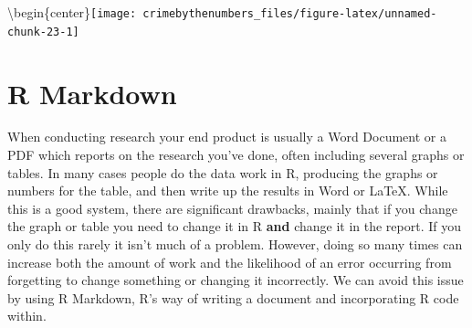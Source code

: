\documentclass[
  12pt,
]{book}
\newenvironment{Shaded}{\begin{snugshade}}{\end{snugshade}}
\newcommand{\DataTypeTok}[1]{\textcolor[rgb]{0.27,0.27,0.27}{#1}}
\newcommand{\DecValTok}[1]{\textcolor[rgb]{0.06,0.06,0.06}{#1}}
\newcommand{\KeywordTok}[1]{\textcolor[rgb]{0.27,0.27,0.27}{\textbf{#1}}}
\newcommand{\NormalTok}[1]{#1}
\newcommand{\OperatorTok}[1]{\textcolor[rgb]{0.43,0.43,0.43}{\textbf{#1}}}
\newcommand{\StringTok}[1]{\textcolor[rgb]{0.5,0.5,0.5}{#1}}
\begin{document}
\begin{Shaded}
\end{Shaded}

\textbackslash begin\{center\}\texttt{[image: crimebythenumbers\_files/figure-latex/unnamed-chunk-23-1]}

\hypertarget{r-markdown}{%
\chapter{R Markdown}\label{r-markdown}}

When conducting research your end product is usually a Word Document or a PDF which reports on the research you've done, often including several graphs or tables. In many cases people do the data work in R, producing the graphs or numbers for the table, and then write up the results in Word or LaTeX. While this is a good system, there are significant drawbacks, mainly that if you change the graph or table you need to change it in R \textbf{and} change it in the report. If you only do this rarely it isn't much of a problem. However, doing so many times can increase both the amount of work and the likelihood of an error occurring from forgetting to change something or changing it incorrectly. We can avoid this issue by using R Markdown, R's way of writing a document and incorporating R code within.
\end{document}
